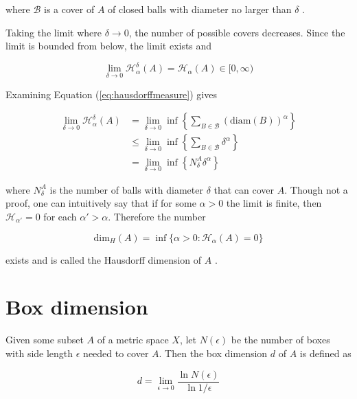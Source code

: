 where $\mathcal{B}$ is a cover of $A$ of closed balls with diameter no larger than $\delta$ \cite{Heinonen:HausdorffDimMath}.

Taking the limit where $\delta \to 0$, the number of possible covers decreases. Since the limit is bounded from below, the limit exists \cite{Rudin:PrincMathAnalysis} and

\begin{equation}
    \lim_{\delta \to 0} \mathcal{H}^{\delta}_{\alpha} (A) = \mathcal{H}_\alpha (A) \in [0, \infty )
\label{eq:hausdorffmeasure}
\end{equation}

Examining Equation (\ref{eq:hausdorffmeasure}) gives

\begin{align}
    \lim_{\delta \to 0} \mathcal{H}^{\delta}_{\alpha} (A) &= \lim_{\delta \to 0} \inf \left \{ \sum_{B \in \mathcal{B}} \left ( \text{diam}(B) \right)^\alpha \right \} \\
%
    &\leq \lim_{\delta \to 0} \inf \left \{ \sum_{B \in \mathcal{B}} \delta^\alpha \right \} \\
%
    &= \lim_{\delta \to 0} \inf \left \{ N_{\delta}^A \delta^\alpha \right \}
\end{align}

where $N_{\delta}^A$ is the number of balls with diameter $\delta$ that can cover $A$. Though not a proof, one can intuitively say that if for some $\alpha > 0$ the limit is finite, then $\mathcal{H}_{\alpha'} = 0$ for each $\alpha' > \alpha$. Therefore the number

\begin{equation}
    \text{dim}_H (A) = \inf \{ \alpha > 0 : \mathcal{H}_\alpha (A) = 0 \}
\end{equation}

exists and is called the Hausdorff dimension of $A$ \cite{Heinonen:HausdorffDimMath}.


\section{Box dimension}
\label{sec:boxdimension}

Given some subset $A$ of a metric space $X$, let $N(\epsilon)$ be the number of boxes with side length $\epsilon$ needed to cover $A$. Then the box dimension $d$ of $A$ is defined as \cite{strogatz:dynamics_chaos}

\begin{equation}
    d = \lim_{\epsilon \to 0} \frac{\ln N(\epsilon)}{\ln 1 / \epsilon}
\end{equation}

